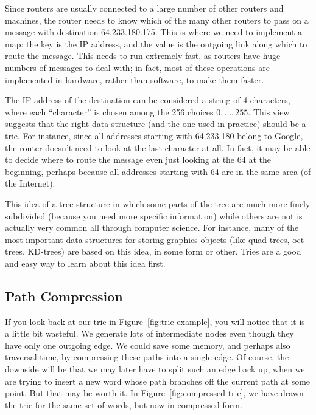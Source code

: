 Since routers are usually connected to a large number of other routers
and machines, the router needs to know which of the many other routers
to pass on a message with destination 64.233.180.175.
This is where we need to implement a map: the key is the IP address,
and the value is the outgoing link along which to route the message.
This needs to run extremely fast, as routers have huge numbers of
messages to deal with; in fact, most of these operations are
implemented in hardware, rather than software, to make them faster.

The IP address of the destination can be considered a string of 4
characters, where each ``character'' is chosen among the 256 choices
$0, \ldots, 255$. This view suggests that the right data structure
(and the one used in practice) should be a trie. For instance, since
all addresses starting with 64.233.180 belong to Google, the router
doesn't need to look at the last character at all. In fact, it may be
able to decide where to route the message even just looking at the 64
at the beginning, perhaps because all addresses starting with 64 are
in the same area (of the Internet).

This idea of a tree structure in which some parts of the tree are much
more finely subdivided (because you need more specific information)
while others are not is actually very common all through computer
science. For instance, many of the most important data structures for
storing graphics objects (like quad-trees, oct-trees, KD-trees) are
based on this idea, in some form or other. Tries are a good and easy
way to learn about this idea first.

\subsection{Path Compression}
If you look back at our trie in Figure~\ref{fig:trie-example}, you
will notice that it is a little bit wasteful. We generate lots of
intermediate nodes even though they have only one outgoing edge. We
could save some memory, and perhaps also traversal time, by
compressing these paths into a single edge. Of course, the downside
will be that we may later have to split such an edge back up, when we
are trying to insert a new word whose path branches off the current
path at some point. But that may be worth it. In
Figure~\ref{fig:compressed-trie}, we have drawn the trie for the same
set of words, but now in compressed form.

